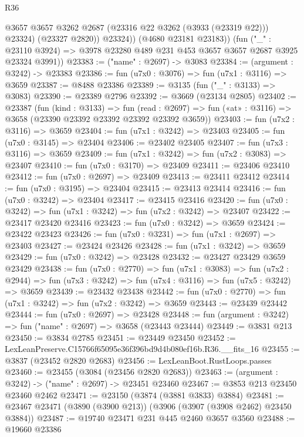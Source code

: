 \begin{lexlean}{R36}
\begin{coremodule}
                @3657
                @3657
                @3262
                @2687
                (@23316 @22 @3262 (@3933 (@23319 @22)))
                @23324)
              (@23327 @2820))
            @23324))
        (@4680 @23181 @23183))
      (fun ("_" : @23110 @3924) =>
      @3978 @23280 @489 @231 @453 @3657 @3657 @2687 @3925 @23324 @3991))
@23383 := ("name" : @2697) -> @3083
@23384 := (argument : @3242) -> @23383
@23386 := fun (u7x0 : @3076) => fun (u7x1 : @3116) => @3659
@23387 := @8488 @23386
@23389 := @3135 (fun ("_" : @3133) => @3083)
@23390 := @23389 @2796
@23392 := @3669 (@23134 @2805)
@23402 := @23387
    (fun (kind : @3133) =>
    fun (read : @2697) => fun («at» : @3116) => @3658 (@23390 @23392 @23392 @23392 @23392 @3659))
@23403 := fun (u7x2 : @3116) => @3659
@23404 := fun (u7x1 : @3242) => @23403
@23405 := fun (u7x0 : @3145) => @23404
@23406 := @23402 @23405
@23407 := fun (u7x3 : @3116) => @3659
@23409 := fun (u7x1 : @3242) => fun (u7x2 : @3083) => @23407
@23410 := fun (u7x0 : @3170) => @23409
@23411 := @23406 @23410
@23412 := fun (u7x0 : @2697) => @23409
@23413 := @23411 @23412
@23414 := fun (u7x0 : @3195) => @23404
@23415 := @23413 @23414
@23416 := fun (u7x0 : @3242) => @23404
@23417 := @23415 @23416
@23420 := fun (u7x0 : @3242) => fun (u7x1 : @3242) => fun (u7x2 : @3242) => @23407
@23422 := @23417 @23420 @23416
@23423 := fun (u7x0 : @3242) => @3659
@23424 := @23422 @23423
@23426 := fun (u7x0 : @3231) => fun (u7x1 : @2697) => @23403
@23427 := @23424 @23426
@23428 := fun (u7x1 : @3242) => @3659
@23429 := fun (u7x0 : @3242) => @23428
@23432 := @23427 @23429 @3659 @23429
@23438 := fun (u7x0 : @2770) =>
  fun (u7x1 : @3083) =>
  fun (u7x2 : @2944) => fun (u7x3 : @3242) => fun (u7x4 : @3116) => fun (u7x5 : @3242) => @3659
@23439 := @23432 @23438
@23442 := fun (u7x0 : @2770) => fun (u7x1 : @3242) => fun (u7x2 : @3242) => @3659
@23443 := @23439 @23442
@23444 := fun (u7x0 : @2697) => @23428
@23448 := fun (argument : @3242) => fun ("name" : @2697) => @3658 (@23443 @23444)
@23449 := @3831 @213
@23450 := @3834 @2785
@23451 := @23449 @23450
@23452 := LexLeanPreserve.C15766f65095e36f396bd9d4b080ef16b.R36.__fits_16
@23455 := @3837 (@23452 @2820 @2683)
@23456 := LexLeanBoot.RustLoops.passes
@23460 := @23455 (@3084 (@23456 @2820 @2683))
@23463 := (argument : @3242) -> ("name" : @2697) -> @23451 @23460
@23467 := @3853 @213 @23450 @23460 @2462
@23471 := @23150 (@3874 (@3881 @3833) @3884)
@23481 := @23467 @23471 (@3890 (@3900 @213)) (@3906 (@3907 (@3908 @2462) @23450 @3884))
@23487 := @19740 @23471 @231 @445 @2460 @3657 @3560
@23488 := @19660 @23386

\end{coremodule}
\end{lexlean}
